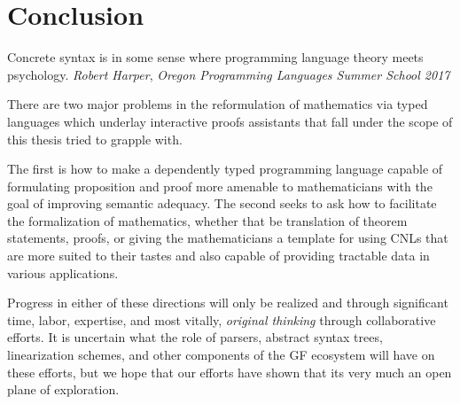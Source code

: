 \section{Conclusion}

\begin{displayquote}
Concrete syntax is in some sense where programming language theory meets
psychology. \emph{Robert Harper}, \emph{Oregon Programming Languages Summer School 2017}
\end{displayquote}



There are two major problems in the reformulation of mathematics via
typed languages which underlay interactive proofs assistants that fall under the
scope of this thesis tried to grapple with. 

The first is how to make a dependently typed programming language capable of
formulating proposition and proof more amenable to mathematicians with the goal
of improving semantic adequacy. The second seeks to ask how to facilitate the
formalization of mathematics, whether that be translation of theorem statements,
proofs, or giving the mathematicians a template for using CNLs that are more
suited to their tastes and also capable of providing tractable data in various
applications.

Progress in either of these directions will only be realized and through
significant time, labor, expertise, and most vitally, \emph{original thinking}
through collaborative efforts. It is uncertain what the role of parsers,
abstract syntax trees, linearization schemes, and other components of the GF
ecosystem will have on these efforts, but we hope that our efforts have shown
that its very much an open plane of exploration. 

